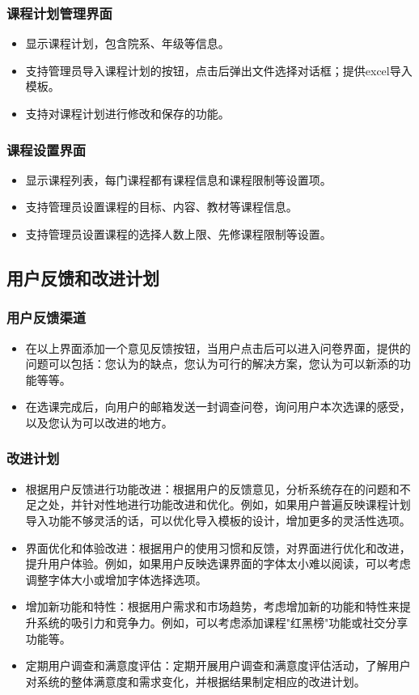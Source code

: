 \documentclass{article}
\begin{document}
\subsubsection{课程计划管理界面}
\begin{itemize}
	\item 显示课程计划，包含院系、年级等信息。
	\item 支持管理员导入课程计划的按钮，点击后弹出文件选择对话框；提供excel导入模板。
	\item 支持对课程计划进行修改和保存的功能。
\end{itemize}

\subsubsection{课程设置界面}
\begin{itemize}
	\item 显示课程列表，每门课程都有课程信息和课程限制等设置项。
	\item 支持管理员设置课程的目标、内容、教材等课程信息。
	\item 支持管理员设置课程的选择人数上限、先修课程限制等设置。
\end{itemize}

\subsection{用户反馈和改进计划}
\subsubsection{用户反馈渠道}
\begin{itemize}
	\item 在以上界面添加一个意见反馈按钮，当用户点击后可以进入问卷界面，提供的问题可以包括：您认为的缺点，您认为可行的解决方案，您认为可以新添的功能等等。
	\item 在选课完成后，向用户的邮箱发送一封调查问卷，询问用户本次选课的感受，以及您认为可以改进的地方。
\end{itemize}

\subsubsection{改进计划}
\begin{itemize}
	\item 根据用户反馈进行功能改进：根据用户的反馈意见，分析系统存在的问题和不足之处，并针对性地进行功能改进和优化。例如，如果用户普遍反映课程计划导入功能不够灵活的话，可以优化导入模板的设计，增加更多的灵活性选项。
	\item 界面优化和体验改进：根据用户的使用习惯和反馈，对界面进行优化和改进，提升用户体验。例如，如果用户反映选课界面的字体太小难以阅读，可以考虑调整字体大小或增加字体选择选项。
	\item 增加新功能和特性：根据用户需求和市场趋势，考虑增加新的功能和特性来提升系统的吸引力和竞争力。例如，可以考虑添加课程"红黑榜"功能或社交分享功能等。
	\item 定期用户调查和满意度评估：定期开展用户调查和满意度评估活动，了解用户对系统的整体满意度和需求变化，并根据结果制定相应的改进计划。
\end{itemize}
\end{document}
